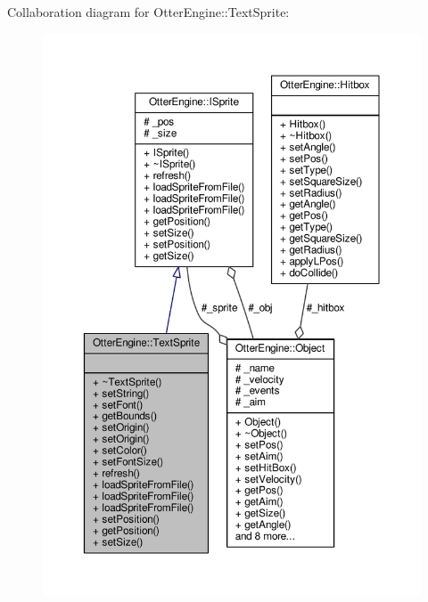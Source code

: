 Collaboration diagram for Otter\+Engine\+:\+:Text\+Sprite\+:\nopagebreak
\begin{figure}[H]
\begin{center}
\leavevmode
\includegraphics[width=350pt]{da/df8/class_otter_engine_1_1_text_sprite__coll__graph}
\end{center}
\end{figure}
